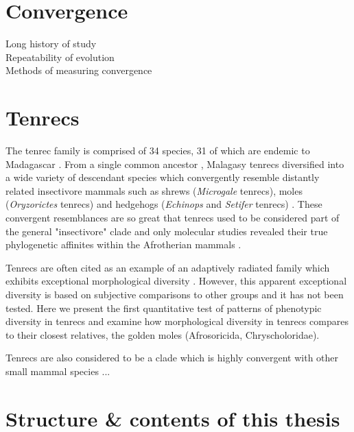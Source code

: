 \section{Convergence}
Long history of study\\
Repeatability of evolution\\
Methods of measuring convergence

\section{Tenrecs}
	
	The tenrec family is comprised of 34 species, 31 of which are endemic to Madagascar \citep{Olson2013}. From a single common ancestor \citep{Asher2006}, Malagasy tenrecs diversified into a wide variety of descendant species which convergently resemble distantly related insectivore mammals such as shrews (\textit{Microgale} tenrecs), moles (\textit{Oryzorictes} tenrecs) and hedgehogs (\textit{Echinops} and \textit{Setifer} tenrecs) \citep{Eisenberg1969}. These convergent resemblances are so great that tenrecs used to be considered part of the general "insectivore" clade and only molecular studies revealed their true phylogenetic affinites within the Afrotherian mammals \citep{Stanhope1998}.  
	

	Tenrecs are often cited as an example of an adaptively radiated family which exhibits exceptional morphological diversity \citep{Soarimalala2011, Olson2003, Eisenberg1969}. However, this apparent exceptional diversity is based on subjective comparisons to other groups and it has not been tested. Here we present the first quantitative test of patterns of phenotypic diversity in tenrecs and examine how morphological diversity in tenrecs compares to their closest relatives, the golden moles (Afrosoricida, Chryscholoridae). 
	

	
	Tenrecs are also considered to be a clade which is highly convergent with other small mammal species ...

\section{Structure \& contents of this thesis}
	
